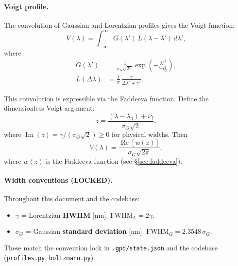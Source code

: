 \documentclass[11pt]{article}
\newcommand{\wfn}{w}  %
\newcommand{\re}{\operatorname{Re}}
\newcommand{\im}{\operatorname{Im}}
\begin{document}
\paragraph{Voigt profile.}
The convolution of Gaussian and Lorentzian profiles gives the Voigt function:
\begin{equation}
  V(\lambda) = \int_{-\infty}^{\infty} G(\lambda')\,L(\lambda - \lambda')\,d\lambda',
  \label{eq:voigt_conv}
\end{equation}
where
\begin{align}
  G(\lambda') &= \frac{1}{\sigma_G\sqrt{2\pi}}
    \exp\!\left(-\frac{\lambda'^2}{2\sigma_G^2}\right), \label{eq:gaussian} \\[4pt]
  L(\Delta\lambda) &= \frac{1}{\pi}\,\frac{\gamma}{\Delta\lambda^2 + \gamma^2}. \label{eq:lorentzian}
\end{align}

This convolution is expressible via the Faddeeva function. Define the
dimensionless Voigt argument:
\begin{equation}
  \boxed{z = \frac{(\lambda - \lambda_0) + i\gamma}{\sigma_G\sqrt{2}},}
  \label{eq:z_voigt}
\end{equation}
where $\im(z) = \gamma / (\sigma_G\sqrt{2}) \geq 0$ for physical widths.
Then
\begin{equation}
  \boxed{V(\lambda) = \frac{\re[\wfn(z)]}{\sigma_G\sqrt{2\pi}},}
  \label{eq:voigt_faddeeva}
\end{equation}
where $\wfn(z)$ is the Faddeeva function (see \S\ref{sec:faddeeva}).

\paragraph{Width conventions (LOCKED).}
Throughout this document and the codebase:
\begin{itemize}
  \item $\gamma$ = Lorentzian \textbf{HWHM} [nm]. $\text{FWHM}_L = 2\gamma$.
  \item $\sigma_G$ = Gaussian \textbf{standard deviation} [nm]. $\text{FWHM}_G = 2.3548\,\sigma_G$.
\end{itemize}
These match the convention lock in \texttt{.gpd/state.json} and the codebase
(\texttt{profiles.py}, \texttt{boltzmann.py}).
\end{document}
